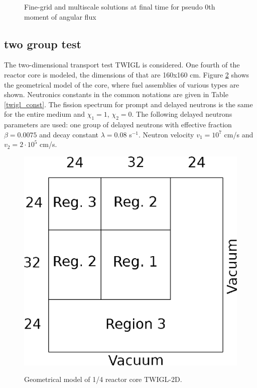 \documentclass[preprint]{elsarticle}
\begin{document}
\begin{figure}[ht]
	\caption{Fine-grid and multiscale solutions at final time for pseudo 0th moment of angular flux}
	\label{small_solutions}
\end{figure}

\subsection{two group test}
%

The two-dimensional transport test TWIGL is considered.
One fourth of the reactor core is modeled, the dimensions of that are 160x160 cm.
Figure \ref{twigl} shows the geometrical model of the core, where fuel assemblies of various types are shown.
Neutronics constants in the common notations are given in Table \ref{twigl_const}.
The fission spectrum for prompt and delayed neutrons is the same for the entire medium and $\chi_1 = 1$, $\chi_2 = 0$.
The following delayed neutrons parameters are used: one group of delayed neutrons with eﬀective fraction $\beta = 0.0075$ and decay constant $\lambda = 0.08$ s$^{-1}$. 
Neutron velocity $v_1 = 10^7$ cm/s and $v_2 = 2 \cdot 10^5$ cm/s.

\begin{figure}[ht]
\begin{center}
	\includegraphics[width=0.5\linewidth]{twigl/twigl_geo.eps} \\
	\caption{\label{image:canonsummary}Geometrical model of 1/4 reactor core TWIGL-2D.}
	\label{twigl}
\end{center}
\end{figure}
\end{document}
